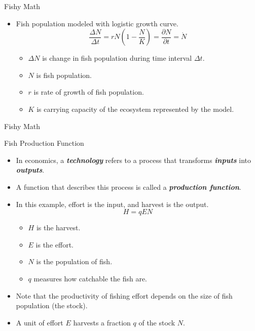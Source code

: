 \begin{frame}{Fishy Math}
	\begin{itemize}
		\item Fish population modeled with logistic growth curve.
		\[
		\frac{\Delta N}{\Delta t} = rN\left(1 - \frac{N}{K}\right) = \frac{\partial N}{\partial t} = \dot{N}
		\]
		\begin{itemize}
			\item $\Delta N$ is change in fish population during time interval $\Delta t$.
			\item $N$ is fish population.
			\item $r$ is rate of growth of fish population.
			\item $K$ is carrying capacity of the ecosystem represented by the model.
		\end{itemize}
	\end{itemize}
\end{frame}

\begin{frame}{Fishy Math}
\end{frame}

\begin{frame}{Fish Production Function}
	\begin{itemize}
		\item In economics, a \textbf{\textit{technology}} refers to a process that transforms \textit{\textbf{inputs}} into \textit{\textbf{outputs}}.
		\item A function that describes this process is called a \textit{\textbf{production function}}.
		\item In this example, effort is the input, and harvest is the output.
		\[
		H = qEN
		\]
		\begin{itemize}
			\item $H$ is the harvest.
			\item $E$ is the effort.
			\item $N$ is the population of fish.
			\item $q$ measures how catchable the fish are.
		\end{itemize}
		\item Note that the productivity of fishing effort depends on the size of fish population (the stock).
		\item A unit of effort $E$ harvests a fraction $q$ of the stock $N$.
	\end{itemize}
\end{frame}

